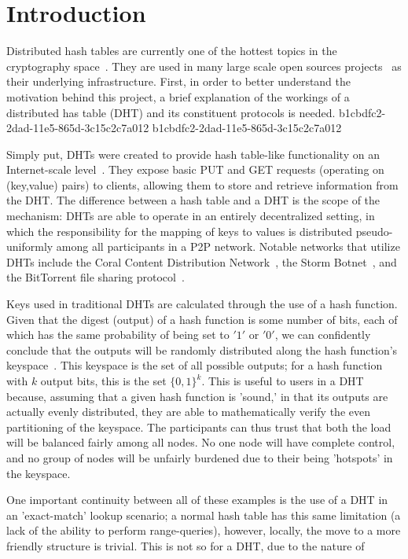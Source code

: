 \documentclass[12pt]{article}
\begin{document}
\section{Introduction}
\par Distributed hash tables are currently one of the hottest topics in the cryptography space~\cite{Stoica:2001dj,Rowstron:2001ea,Ratnasamy:2001wn}. They are used in many large scale open sources projects~\cite{Freitas:2013tb,Xu:2010vs,Perfitt:2010fh} as their underlying infrastructure. First, in order to better understand the motivation behind this project, a brief explanation of the workings of a distributed has table (DHT) and its constituent protocols is needed.
b1cbdfc2-2dad-11e5-865d-3c15c2c7a012
b1cbdfc2-2dad-11e5-865d-3c15c2c7a012\par Simply put, DHTs were created to provide hash table-like functionality on an Internet-scale level~\cite{Ratnasamy:2001wn}. They expose basic PUT and GET requests (operating on (key,value) pairs) to clients, allowing them to store and retrieve information from the DHT. The difference between a hash table and a DHT is the scope of the mechanism: DHTs are able to operate in an entirely decentralized setting, in which the responsibility for the mapping of keys to values is distributed pseudo-uniformly among all participants in a P2P network. Notable networks that utilize DHTs include the Coral Content Distribution Network~\cite{Freedman:2004vb}, the Storm Botnet~\cite{Holz:2008uk}, and the BitTorrent file sharing protocol~\cite{Cohen:y1_8mBnw}.

\par Keys used in traditional DHTs are calculated through the use of a hash function. Given that the digest (output) of a hash function is some number of bits, each of which has the same probability of being set to $'1'$ or $'0'$, we can confidently conclude that the outputs will be randomly distributed along the hash function's keyspace~. This keyspace is the set of all possible outputs; for a hash function with $k$ output bits, this is the set $\{0,1\}^k$. This is useful to users in a DHT because, assuming that a given hash function is 'sound,' in that its outputs are actually evenly distributed, they are able to mathematically verify the even partitioning of the keyspace. The participants can thus trust that both the load will be balanced fairly among all nodes. No one node will have complete control, and no group of nodes will be unfairly burdened due to their being 'hotspots' in the keyspace.~

\par One important continuity between all of these examples is the use of a DHT in an 'exact-match' lookup scenario; a normal hash table has this same limitation (a lack of the ability to perform range-queries), however, locally, the move to a more friendly structure is trivial. This is not so for a DHT, due to the nature of
\printbibliography
\end{document}
